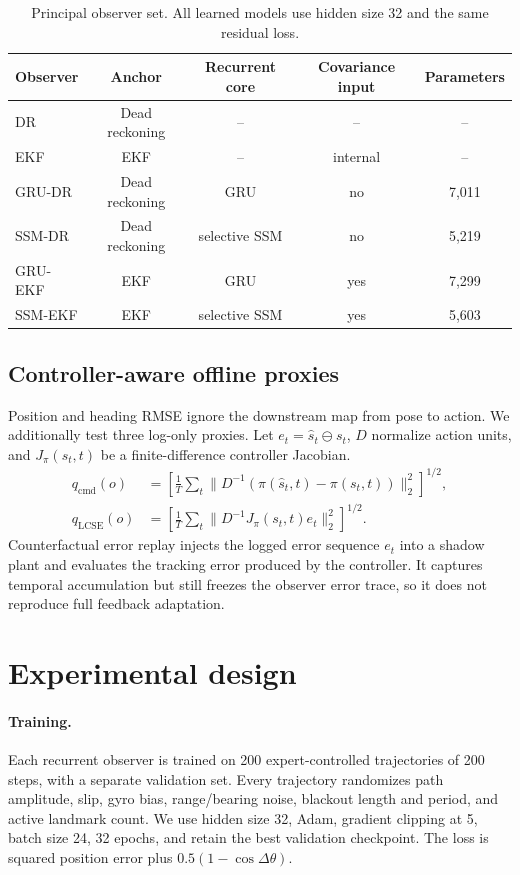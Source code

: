 \documentclass{article}
\newcommand{\obs}[1]{\textsc{#1}}
\begin{document}
\begin{table}[t]
\centering
\caption{Principal observer set. All learned models use hidden size 32 and the same residual loss.}
\label{tab:zoo}
\small
\begin{tabular}{lcccc}
\toprule
Observer & Anchor & Recurrent core & Covariance input & Parameters\\
\midrule
\obs{DR} & Dead reckoning & -- & -- & --\\
\obs{EKF} & EKF & -- & internal & --\\
\obs{GRU-DR} & Dead reckoning & GRU & no & 7,011\\
\obs{SSM-DR} & Dead reckoning & selective SSM & no & 5,219\\
\obs{GRU-EKF} & EKF & GRU & yes & 7,299\\
\obs{SSM-EKF} & EKF & selective SSM & yes & 5,603\\
\bottomrule
\end{tabular}
\end{table}

\subsection{Controller-aware offline proxies}
Position and heading RMSE ignore the downstream map from pose to action. We additionally test three log-only proxies. Let $e_t=\hat s_t\ominus s_t$, $D$ normalize action units, and $J_\pi(s_t,t)$ be a finite-difference controller Jacobian.
\begin{align}
q_{\mathrm{cmd}}(o)&=\left[\frac1T\sum_t\|D^{-1}(\pi(\hat s_t,t)-\pi(s_t,t))\|_2^2\right]^{1/2},\\
q_{\mathrm{LCSE}}(o)&=\left[\frac1T\sum_t\|D^{-1}J_\pi(s_t,t)e_t\|_2^2\right]^{1/2}.
\end{align}
Counterfactual error replay injects the logged error sequence $e_t$ into a shadow plant and evaluates the tracking error produced by the controller. It captures temporal accumulation but still freezes the observer error trace, so it does not reproduce full feedback adaptation.

\section{Experimental design}
\paragraph{Training.}
Each recurrent observer is trained on 200 expert-controlled trajectories of 200 steps, with a separate validation set. Every trajectory randomizes path amplitude, slip, gyro bias, range/bearing noise, blackout length and period, and active landmark count. We use hidden size 32, Adam, gradient clipping at 5, batch size 24, 32 epochs, and retain the best validation checkpoint. The loss is squared position error plus $0.5(1-\cos\Delta\theta)$.
\end{document}
